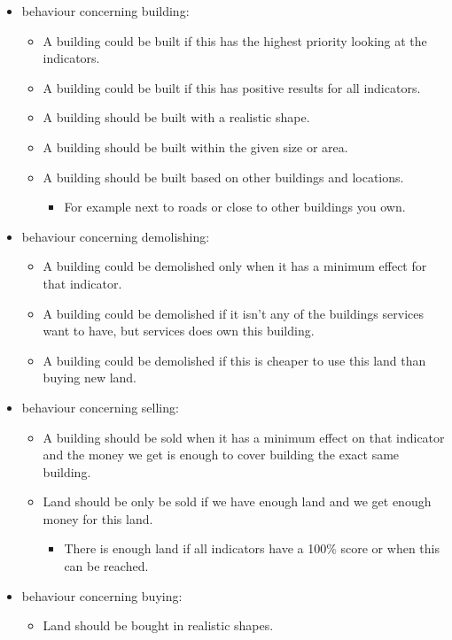 \begin{itemize}
\begin{itemize}
	\end{itemize}
	\item behaviour concerning building:
	\begin{itemize}
		\item A building could be built if this has the highest priority looking at the indicators.
		\item A building could be built if this has positive results for all indicators.
		\item A building should be built with a realistic shape.
		\item A building should be built within the given size or area.
		\item A building should be built based on other buildings and locations.
		\begin{itemize}
			\item For example next to roads or close to other buildings you own.
		\end{itemize}
	\end{itemize}
	\item behaviour concerning demolishing:
	\begin{itemize}
		\item A building could be demolished only when it has a minimum effect for that indicator.
		\item A building could be demolished if it isn't any of the buildings services want to have, but services does own this building.
		\item A building could be demolished if this is cheaper to use this land than buying new land.
	\end{itemize}
	\item behaviour concerning selling:
	\begin{itemize}
		\item 	A building should be sold when it has a minimum effect on that indicator and the money we get is enough to cover building the exact same building.
		\item	Land should be only be sold if we have enough land and we get enough money for this land.
		\begin{itemize}
			\item 	There is enough land if all indicators have a 100$\%$ score or when this can be reached.
		\end{itemize}
	\end{itemize}
	\item behaviour concerning buying:
	\begin{itemize}
		\item 	Land should be bought in realistic shapes. 

\end{itemize}
\end{itemize}
